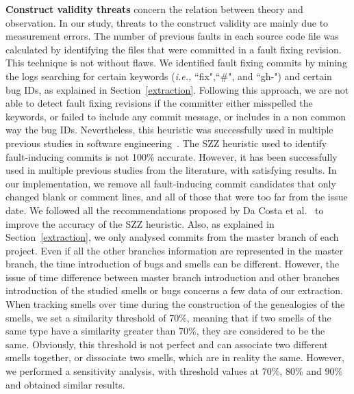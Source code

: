 \documentclass[smallcondensed]{svjour3}
\newcommand{\ie}{{\textit{i.e.,}}}
\newcommand{\Foutse}[1]{\textcolor{red}{{\it [Foutse says: #1]}}}
\begin{document}
\textbf{Construct validity threats} concern the relation between theory and observation. In our study, threats to the construct validity are mainly due to measurement errors. %
The number of previous faults in each source code file was calculated by identifying the files that were committed in a fault fixing revision. This technique is not without flaws. We identified fault fixing commits by mining the logs searching for certain keywords (\ie{} ``fix",``\#", and ``gh-") and certain bug IDs, as explained in Section~\ref{extraction}. Following this approach, we are not able to detect fault fixing revisions if the committer either misspelled the keywords, or failed to include any commit message, or includes in a non common way the bug IDs. Nevertheless, this heuristic was successfully used in multiple previous studies in software engineering~\cite{jaafar2013mining,shihab2013studying}. The SZZ heuristic used to identify fault-inducing commits is not 100\% accurate. However, it has been successfully used in multiple previous studies from the literature, with satisfying results. In our implementation, we remove all fault-inducing commit candidates that only changed blank or comment lines, {\color{blue} and all of those that were too far from the issue date. We followed all the recommendations proposed by Da Costa et al.~\cite{da2017framework} to improve the accuracy of the SZZ heuristic.  Also, as explained in Section~\ref{extraction}, we only analysed commits from the master branch of each project. Even if all the other branches information are represented in the master branch, the time introduction of bugs and smells can be different. However, the issue of time difference between master branch introduction and other branches introduction of the studied smells or bugs concerns a few data of our extraction.} When tracking smells over time during the construction of the genealogies of the smells, we set a similarity threshold of 70\%, meaning that if two smells of the same type have a similarity greater than 70\%, they are considered to be the same. Obviously, this threshold is not perfect and can associate two different smells together, or dissociate two smells, which are in reality the same. However, we performed a sensitivity analysis, with threshold values at 70\%,  80\% and 90\% and obtained similar results. %
	
\end{document}
